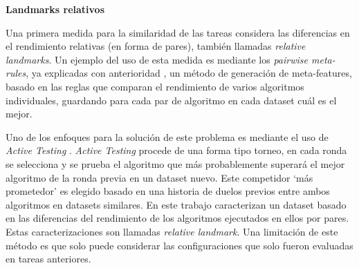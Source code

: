 \quad 

\textbf{Landmarks relativos}


\quad

Una primera medida para la similaridad de las tareas considera las diferencias en el rendimiento relativas (en forma de pares), también llamadas \textit{relative landmarks}. Un ejemplo del uso de esta medida es mediante los \textit{pairwise meta-rules}, ya explicadas con anterioridad \cite{sun2013pairwise}, un método de generación de meta-features, basado en las reglas que comparan el rendimiento de varios algoritmos individuales, guardando para cada par de algoritmo en cada dataset cuál es el mejor.

Uno de los enfoques para la solución de este problema es mediante el uso de \textit{Active Testing} \cite{leite2017selecting}. \textit{Active Testing} procede de una forma tipo torneo, en cada ronda se selecciona y se prueba el algoritmo que más probablemente superará el mejor algoritmo de la ronda previa en un dataset nuevo. Este competidor `más prometedor' es elegido basado en una historia de duelos previos entre ambos algoritmos en datasets similares. En este trabajo \cite{leite2017selecting} caracterizan un dataset basado en las diferencias del rendimiento de los algoritmos ejecutados en ellos por pares. Estas caracterizaciones son llamadas \textit{relative landmark}. Una limitación de este método es que solo puede considerar las configuraciones que solo fueron evaluadas en tareas anteriores.

